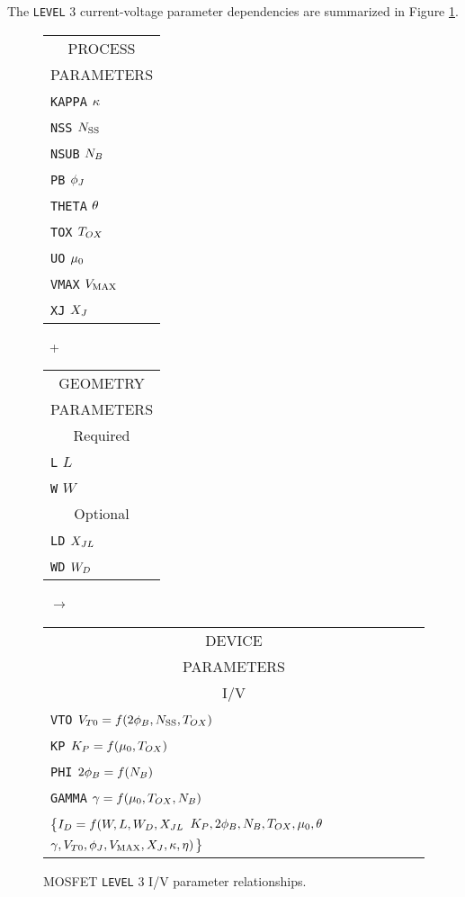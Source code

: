 {The {\tt LEVEL} 3 current-voltage parameter dependencies
are summarized in Figure \ref{mlevel3iv}.\\[0.2in]
\begin{figure}
\begin{tabular}[t]{|p{1in}|}
\hline
\multicolumn{1}{|c|}{PROCESS} \\
\multicolumn{1}{|c|}{PARAMETERS} \\
\hline
\hline
{\tt KAPPA} \hfill $\kappa$\\
{\tt NSS} \hfill $N_{\mbox{\scriptsize SS}}$\\
{\tt NSUB} \hfill $N_B$\\
{\tt PB} \hfill $\phi_J$\\
{\tt THETA} \hfill $\theta$\\
{\tt TOX} \hfill $T_{OX}$\\
{\tt UO} \hfill $\mu_0$\\
{\tt VMAX} \hfill $V_{\mbox{\scriptsize MAX}}$\\
{\tt XJ} \hfill $X_J$\\
\hline
\end{tabular}
\hfill
\parbox{0.1in}{\ \vspace*{0.2in}\newline +}
\hfill
\begin{tabular}[t]{|p{1in}|}
\hline
\multicolumn{1}{|c|}{GEOMETRY} \\
\multicolumn{1}{|c|}{PARAMETERS} \\
\hline
\hline
\multicolumn{1}{|c|}{Required} \\
\hline
{\tt L} \hfill $L$\\
{\tt W} \hfill $W$ \\
\hline
\hline
\multicolumn{1}{|c|}{Optional} \\
\hline
{\tt LD} \hfill $X_{JL}$\\
{\tt WD} \hfill $W_D$ \\
\hline
\end{tabular}
\hfill
\parbox{0.1in}{\ \vspace*{0.2in}\newline $\rightarrow$}
\hfill
\begin{tabular}[t]{|p{1.8in}|}
\hline
\multicolumn{1}{|c|}{DEVICE} \\
\multicolumn{1}{|c|}{PARAMETERS} \\
\hline
\hline
\multicolumn{1}{|c|}{I/V}\\
\hline
{\tt VTO} \hfill $V_{T0} = f(2\phi_B, N_{\mbox{\scriptsize SS}}, T_{OX})$\\
{\tt KP} \hfill $K_P = f(\mu_0, T_{OX})$\\
{\tt PHI} \hfill $2\phi_B = f(N_B)$\\
{\tt GAMMA} \hfill $\gamma = f(\mu_0, T_{OX}, N_B)$\\
\{$I_{D} = f(W, L, W_D, X_{JL}$\newline
\hspace*{\fill}$K_P, 2\phi_B, N_B, T_{OX}, \mu_0, \theta$\newline
\hspace*{\fill}$\gamma, V_{T0}, \phi_J, V_{\mbox{\scriptsize MAX}}, X_J, \kappa, \eta)$\}\\
\hline
\end{tabular}
\caption{ MOSFET {\tt LEVEL} 3 I/V parameter relationships.
\label{mlevel3iv}}
\end{figure}}
